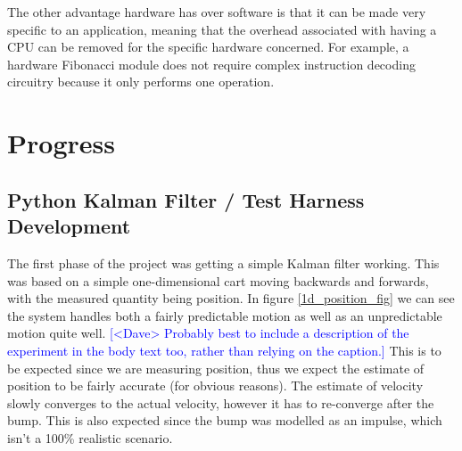 \documentclass[12pt]{article}
\newcommand{\note}[2][red]{\textcolor{#1}{#2}}
\newcommand{\notedme}[1]{\note[blue]{[<Dave> #1]}}
\begin{document}
The other advantage hardware has over software is that it can be made very specific to an application, meaning that the overhead associated with having a CPU can be removed for the specific hardware concerned. For example, a hardware Fibonacci module does not require complex instruction decoding circuitry because it only performs one operation.

\section{Progress}

\subsection{Python Kalman Filter / Test Harness Development}

The first phase of the project was getting a simple Kalman filter working. This was based on a simple one-dimensional cart moving backwards and forwards, with the measured quantity being position. In figure \ref{1d_position_fig} we can see the system handles both a fairly predictable motion as well as an unpredictable motion quite well. 
\notedme{Probably best to include a description of the experiment in the body text too, rather than relying on the caption.} 
This is to be expected since we are measuring position, thus we expect the estimate of position to be fairly accurate (for obvious reasons). The estimate of velocity slowly converges to the actual velocity, however it has to re-converge after the bump. This is also expected since the bump was modelled as an impulse, which isn't a 100\% realistic scenario.
\end{document}
